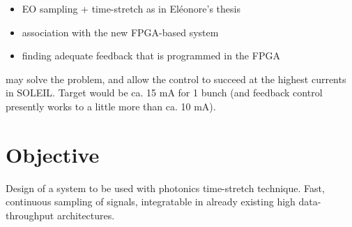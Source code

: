 \begin{itemize}
	\item EO sampling + time-stretch as in Eléonore's thesis
	\item association with the new FPGA-based system
	\item finding adequate feedback that is programmed in the FPGA
\end{itemize}
may solve the problem, and allow the control to succeed at the highest currents in SOLEIL. 
Target would be ca. 15 mA for 1 bunch (and feedback control presently works to a little more than ca. 10 mA).

\section{Objective}
Design of a system to be used with photonics time-stretch technique. Fast, continuous sampling of signals, integratable in already existing high data-throughput architectures.






%









